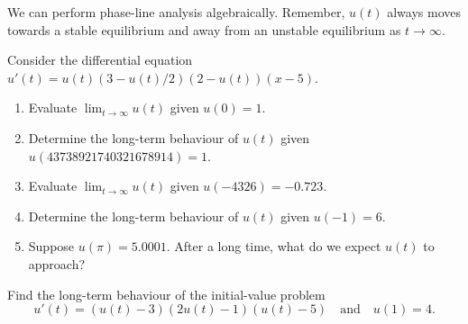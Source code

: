 \documentclass[../main.tex]{subfiles}
\begin{document}
\clearpage
We can perform phase-line analysis algebraically. \faPencil*{} Remember, \(u(t)\) always moves towards a stable equilibrium and away from an unstable equilibrium as \(t \to \infty\).

\begin{example}
  Consider the differential equation \(u'(t) = u(t)  (3 - u(t)/2) ( 2 - u(t) )(x-5)\). 
  \begin{enumerate}[wide]
    \item Evaluate \(\lim_{t \to \infty} u(t)\) given \(u(0) = 1\).  
    \item Determine the long-term behaviour of \(u(t)\) given \(u(43738921740321678914) = 1\).  
    \item Evaluate \(\lim_{t \to \infty} u(t)\) given \(u(-4326) = -0.723\).  
    \item Determine the long-term behaviour of \(u(t)\) given \(u(-1) = 6\).  
    \item Suppose \(u(\pi) = 5.0001\). After a long time, what do we expect \(u(t)\) to approach?
  \end{enumerate}
\end{example}


%
%

\clearpage


\begin{example}
  Find the long-term behaviour of the initial-value problem 
  \[
    u'(t) = (u(t) - 3) (2u(t) - 1) (u(t) - 5) \quad\text{and}\quad u(1) = 4.
  \]
\end{example}
\end{document}
